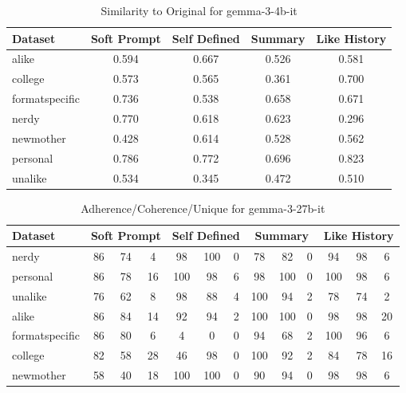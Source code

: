 \documentclass[11pt]{article}
\begin{document}
\begin{table}[H]
    \centering
    \caption{Similarity to Original for gemma-3-4b-it}
    \begin{tabular}{|l|c|c|c|c|}
    \hline
    \textbf{Dataset} & \textbf{Soft Prompt} & \textbf{Self Defined} & \textbf{Summary} & \textbf{Like History} \\
    \hline
    alike & 0.594 & 0.667 & 0.526 & 0.581 \\
    \hline
    college & 0.573 & 0.565 & 0.361 & 0.700 \\
    \hline
    formatspecific & 0.736 & 0.538 & 0.658 & 0.671 \\
    \hline
    nerdy & 0.770 & 0.618 & 0.623 & 0.296 \\
    \hline
    newmother & 0.428 & 0.614 & 0.528 & 0.562 \\
    \hline
    personal & 0.786 & 0.772 & 0.696 & 0.823 \\
    \hline
    unalike & 0.534 & 0.345 & 0.472 & 0.510 \\
    \hline
    \end{tabular}
\end{table}

\clearpage

\begin{table}[H]
\centering
\caption{Adherence/Coherence/Unique for gemma-3-27b-it}
\begin{tabular}{|l|ccc|ccc|ccc|ccc|}
\hline
\textbf{Dataset} & \multicolumn{3}{c|}{\textbf{Soft Prompt}} & \multicolumn{3}{c|}{\textbf{Self Defined}} & \multicolumn{3}{c|}{\textbf{Summary}} & \multicolumn{3}{c|}{\textbf{Like History}} \\
\hline
nerdy & 86 & 74 & 4 & 98 & 100 & 0 & 78 & 82 & 0 & 94 & 98 & 6 \\
\hline
personal & 86 & 78 & 16 & 100 & 98 & 6 & 98 & 100 & 0 & 100 & 98 & 6 \\
\hline
unalike & 76 & 62 & 8 & 98 & 88 & 4 & 100 & 94 & 2 & 78 & 74 & 2 \\
\hline
alike & 86 & 84 & 14 & 92 & 94 & 2 & 100 & 100 & 0 & 98 & 98 & 20 \\
\hline
formatspecific & 86 & 80 & 6 & 4 & 0 & 0 & 94 & 68 & 2 & 100 & 96 & 6 \\
\hline
college & 82 & 58 & 28 & 46 & 98 & 0 & 100 & 92 & 2 & 84 & 78 & 16 \\
\hline
newmother & 58 & 40 & 18 & 100 & 100 & 0 & 90 & 94 & 0 & 98 & 98 & 6 \\
\hline
\end{tabular}
\end{table}
\end{document}
